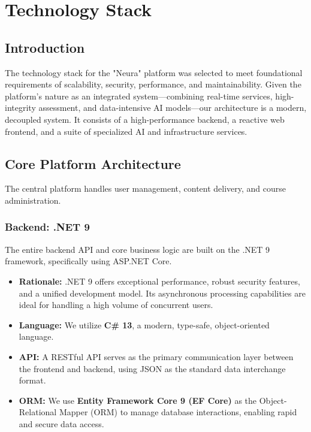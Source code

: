 \chapter{Technology Stack}

\section{Introduction}
The technology stack for the "Neura" platform was selected to meet foundational requirements of scalability, security, performance, and maintainability. Given the platform's nature as an integrated system—combining real-time services, high-integrity assessment, and data-intensive AI models—our architecture is a modern, decoupled system. It consists of a high-performance backend, a reactive web frontend, and a suite of specialized AI and infrastructure services.

\section{Core Platform Architecture}
The central platform handles user management, content delivery, and course administration.

\subsection{Backend: \textbf{.NET 9}}
The entire backend API and core business logic are built on the .NET 9 framework, specifically using ASP.NET Core.
\begin{itemize}
    \item \textbf{Rationale:} .NET 9 offers exceptional performance, robust security features, and a unified development model. Its asynchronous processing capabilities are ideal for handling a high volume of concurrent users.
    \item \textbf{Language:} We utilize \textbf{C\# 13}, a modern, type-safe, object-oriented language.
    \item \textbf{API:} A RESTful API serves as the primary communication layer between the frontend and backend, using JSON as the standard data interchange format.
    \item \textbf{ORM:} We use \textbf{Entity Framework Core 9 (EF Core)} as the Object-Relational Mapper (ORM) to manage database interactions, enabling rapid and secure data access.
\end{itemize}


